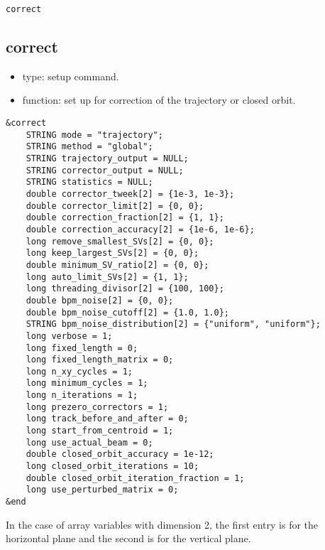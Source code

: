 \documentclass[11pt]{article}
\begin{document}
\begin{latexonly}
\newpage
\begin{center}{\Large\verb|correct|}\end{center}
\end{latexonly}
\subsection{correct \label{subsec:correct}}

\begin{itemize}
\item type: setup command.
\item function: set up for correction of the trajectory or closed orbit.
\end{itemize}

\begin{verbatim}
&correct
    STRING mode = "trajectory";
    STRING method = "global";
    STRING trajectory_output = NULL;
    STRING corrector_output = NULL;
    STRING statistics = NULL;
    double corrector_tweek[2] = {1e-3, 1e-3};
    double corrector_limit[2] = {0, 0};
    double correction_fraction[2] = {1, 1};
    double correction_accuracy[2] = {1e-6, 1e-6};
    long remove_smallest_SVs[2] = {0, 0};
    long keep_largest_SVs[2] = {0, 0};
    double minimum_SV_ratio[2] = {0, 0};
    long auto_limit_SVs[2] = {1, 1};
    long threading_divisor[2] = {100, 100};
    double bpm_noise[2] = {0, 0};
    double bpm_noise_cutoff[2] = {1.0, 1.0};
    STRING bpm_noise_distribution[2] = {"uniform", "uniform"};
    long verbose = 1;
    long fixed_length = 0;
    long fixed_length_matrix = 0;
    long n_xy_cycles = 1;
    long minimum_cycles = 1;
    long n_iterations = 1;
    long prezero_correctors = 1;
    long track_before_and_after = 0;
    long start_from_centroid = 1;
    long use_actual_beam = 0;
    double closed_orbit_accuracy = 1e-12;
    long closed_orbit_iterations = 10;
    double closed_orbit_iteration_fraction = 1;
    long use_perturbed_matrix = 0;
&end
\end{verbatim}

In the case of array variables with dimension 2, the first entry is for the horizontal plane and the second
is for the vertical plane.
\end{document}
